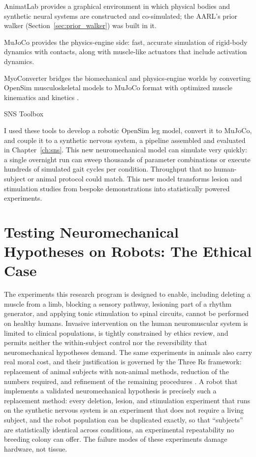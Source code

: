 AnimatLab \citep{cofer_animatlab_2010} provides a graphical environment in which physical bodies and synthetic neural systems are constructed and co-simulated; the AARL's prior walker (Section~\ref{sec:prior_walker}) was built in it. 

MuJoCo \citep{todorov_mujoco_2012} provides the physics-engine side: fast, accurate simulation of rigid-body dynamics with contacts, along with muscle-like actuators that include activation dynamics. 

MyoConverter bridges the biomechanical and physics-engine worlds by converting OpenSim musculoskeletal models to MuJoCo format with optimized muscle kinematics and kinetics \citep{caggiano_myosuite_2022, wang_myosim_2022}. 

SNS Toolbox \citep{nourse_sns_2023}

I used these tools to develop a robotic OpenSim leg model, convert it to MuJoCo, and couple it to a synthetic nervous system, a pipeline assembled and evaluated in Chapter~\ref{ch:sns}. This new neuromechanical model can simulate very quickly: a single overnight run can sweep thousands of parameter combinations or execute hundreds of simulated gait cycles per condition. Throughput that no human-subject or animal protocol could match. This new model transforms lesion and stimulation studies from bespoke demonstrations into statistically powered experiments.

\section{Testing Neuromechanical Hypotheses on Robots: The Ethical Case}\label{sec:bg_ethics}

The experiments this research program is designed to enable, including deleting a muscle from a limb, blocking a sensory pathway, lesioning part of a rhythm generator, and applying tonic stimulation to spinal circuits, cannot be performed on healthy humans. Invasive intervention on the human neuromuscular system is limited to clinical populations, is tightly constrained by ethics review, and permits neither the within-subject control nor the reversibility that neuromechanical hypotheses demand. The same experiments in animals also carry real moral cost, and their justification is governed by the Three Rs framework: replacement of animal subjects with non-animal methods, reduction of the numbers required, and refinement of the remaining procedures \citep{russell_principles_1959, tannenbaum_russell_2015}. A robot that implements a validated neuromechanical hypothesis is precisely such a replacement method: every deletion, lesion, and stimulation experiment that runs on the synthetic nervous system is an experiment that does not require a living subject, and the robot population can be duplicated exactly, so that ``subjects'' are statistically identical across conditions, an experimental repeatability no breeding colony can offer. The failure modes of these experiments damage hardware, not tissue.

